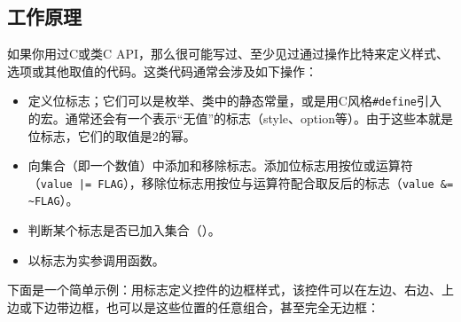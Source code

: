 
\subsection{工作原理}



如果你用过C或类C API，那么很可能写过、至少见过通过操作比特来定义样式、选项或其他取值的代码。这类代码通常会涉及如下操作：


\begin{itemize}
\item 定义位标志；它们可以是枚举、类中的静态常量，或是用C风格\texttt{\#define}引入的宏。通常还会有一个表示“无值”的标志（style、option等）。由于这些本就是位标志，它们的取值是2的幂。



\item 向集合（即一个数值）中添加和移除标志。添加位标志用按位或运算符（\texttt{value |= FLAG}），移除位标志用按位与运算符配合取反后的标志（\texttt{value \&= \textasciitilde{}FLAG}）。



\item 判断某个标志是否已加入集合（）。



\item 以标志为实参调用函数。

\end{itemize}



下面是一个简单示例：用标志定义控件的边框样式，该控件可以在左边、右边、上边或下边带边框，也可以是这些位置的任意组合，甚至完全无边框：



